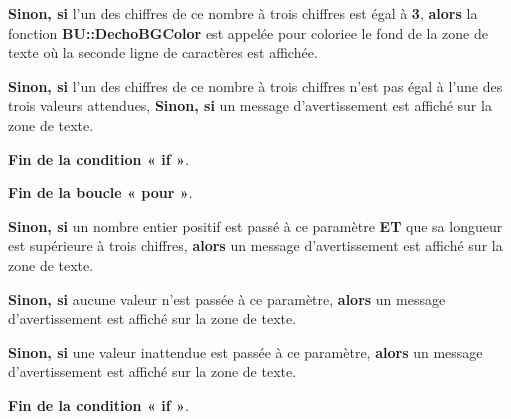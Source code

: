 \documentclass[a4paper,10pt]{article}
\begin{document}
\begin{itemize}
{\begin{justify}
{\begin{itemize}
{                        \begin{justify}
                            \textbf{\color{cond}Sinon, si} l'un des chiffres de ce nombre à trois chiffres est égal à \textbf{3}, \textbf{\color{cond}alors} la fonction \textbf{\color{func}BU::DechoBGColor} est appelée pour coloriee le fond de la zone de texte où la seconde ligne de caractères est affichée.
                        \end{justify}\setlength{\parskip}{1em}

                        \begin{justify}
                            \textbf{\color{cond}Sinon, si} l'un des chiffres de ce nombre à trois chiffres n'est pas égal à l'une des trois valeurs attendues, \textbf{\color{cond}Sinon, si} un message d'avertissement est affiché sur la zone de texte.
                        \end{justify}\setlength{\parskip}{1em}

                        \begin{justify}
                            \textbf{\color{cond}Fin de la condition « if »}.
                        \end{justify}
                    }
                \end{itemize}

                \begin{justify}
                    \textbf{\color{loop}Fin de la boucle « pour »}.
                \end{justify}
            }
        \end{justify}

        \item
        {
            \begin{justify}
                \textbf{\color{cond}Sinon, si} un nombre entier positif est passé à ce paramètre \textbf{ET} que sa longueur est supérieure à trois chiffres, \textbf{\color{cond}alors} un message d'avertissement est affiché sur la zone de texte.
            \end{justify}

            \setlength{\parskip}{1em}

            \begin{justify}
                \textbf{\color{cond}Sinon, si} aucune valeur n'est passée à ce paramètre, \textbf{\color{cond}alors} un message d'avertissement est affiché sur la zone de texte.
            \end{justify}

            \begin{justify}
                \textbf{\color{cond}Sinon, si} une valeur inattendue est passée à ce paramètre, \textbf{\color{cond}alors} un message d'avertissement est affiché sur la zone de texte.
            \end{justify}

            \begin{justify}
                \textbf{\color{cond}Fin de la condition « if »}.
            \end{justify}
        }
    }
\end{itemize}
\end{document}

